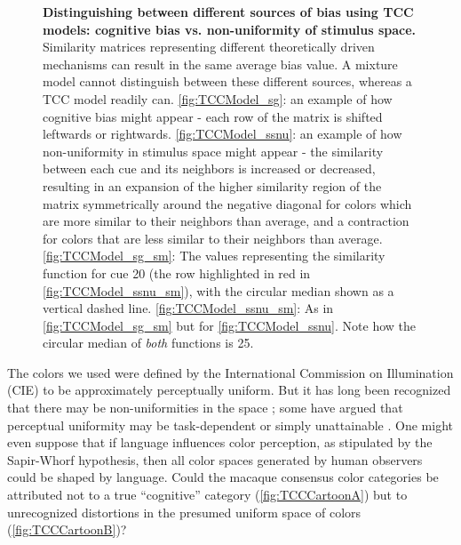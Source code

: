 \begin{figure}
        \caption{\textbf{Distinguishing between different sources of bias using TCC models: cognitive bias vs. non-uniformity of stimulus space.} Similarity matrices representing different theoretically driven mechanisms can result in the same average bias value. A mixture model cannot distinguish between these different sources, whereas a TCC model readily can. \ref{fig:TCCModel_sg}: an example of how cognitive bias might appear - each row of the matrix is shifted leftwards or rightwards. \ref{fig:TCCModel_ssnu}: an example of how non-uniformity in stimulus space might appear - the similarity between each cue and its neighbors is increased or decreased, resulting in an expansion of the higher similarity region of the matrix symmetrically around the negative diagonal for colors which are more similar to their neighbors than average, and a contraction for colors that are less similar to their neighbors than average. \ref{fig:TCCModel_sg_sm}: The values representing the similarity function for cue 20 (the row highlighted in red in \ref{fig:TCCModel_ssnu_sm}), with the circular median shown as a vertical dashed line. \ref{fig:TCCModel_ssnu_sm}: As in \ref{fig:TCCModel_sg_sm} but for \ref{fig:TCCModel_ssnu}. Note how the circular median of \emph{both} functions is 25.}
        \label{fig:TCCDemo}
\end{figure}


The colors we used were defined by the International Commission on Illumination (CIE) to be approximately perceptually uniform. 
But it has long been recognized that there may be non-uniformities in the space%
; some have argued that perceptual uniformity may be task-dependent or simply unattainable%
. 
One might even suppose that if language influences color perception, as stipulated by the Sapir-Whorf hypothesis, then all color spaces generated by human observers could be shaped by language. 
Could the macaque consensus color categories be attributed not to a true “cognitive” category (\autoref{fig:TCCCartoonA}) but to unrecognized distortions in the presumed uniform space of colors (\autoref{fig:TCCCartoonB})? 

